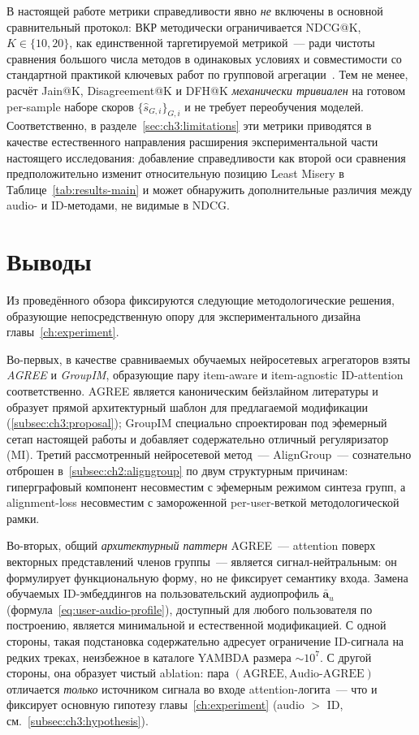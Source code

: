 В настоящей работе метрики справедливости явно \emph{не} включены в основной сравнительный протокол: ВКР методически ограничивается NDCG@K, $K \in \{10, 20\}$, как единственной таргетируемой метрикой~--- ради чистоты сравнения большого числа методов в одинаковых условиях и совместимости со стандартной практикой ключевых работ по групповой агрегации~\cite{cao2018agree, sankar2020groupim, xu2024aligngroup}. Тем не менее, расчёт Jain@K, Disagreement@K и DFH@K \emph{механически тривиален} на готовом per-sample наборе скоров $\{\hat{s}_{G, i}\}_{G, i}$ и не требует переобучения моделей. Соответственно, в разделе~\ref{sec:ch3:limitations} эти метрики приводятся в качестве естественного направления расширения экспериментальной части настоящего исследования: добавление справедливости как второй оси сравнения предположительно изменит относительную позицию Least Misery в Таблице~\ref{tab:results-main} и может обнаружить дополнительные различия между audio- и ID-методами, не видимые в NDCG.

\section{Выводы}
\label{sec:ch2:conclusion}

Из проведённого обзора фиксируются следующие методологические решения, образующие непосредственную опору для экспериментального дизайна главы~\ref{ch:experiment}.

Во-первых, в качестве сравниваемых обучаемых нейросетевых агрегаторов взяты \emph{AGREE} и \emph{GroupIM}, образующие пару item-aware и item-agnostic ID-attention соответственно. AGREE является каноническим бейзлайном литературы и образует прямой архитектурный шаблон для предлагаемой модификации (\ref{subsec:ch3:proposal}); GroupIM специально спроектирован под эфемерный сетап настоящей работы и добавляет содержательно отличный регуляризатор (MI). Третий рассмотренный нейросетевой метод~--- AlignGroup~--- сознательно отброшен в~\ref{subsec:ch2:aligngroup} по двум структурным причинам: гиперграфовый компонент несовместим с эфемерным режимом синтеза групп, а alignment-loss несовместим с замороженной per-user-веткой методологической рамки.

Во-вторых, общий \emph{архитектурный паттерн} AGREE~--- attention поверх векторных представлений членов группы~--- является сигнал-нейтральным: он формулирует функциональную форму, но не фиксирует семантику входа. Замена обучаемых ID-эмбеддингов на пользовательский аудиопрофиль $\bar{\mathbf{a}}_u$ (формула~\eqref{eq:user-audio-profile}), доступный для любого пользователя по построению, является минимальной и естественной модификацией. С одной стороны, такая подстановка содержательно адресует ограничение ID-сигнала на редких треках, неизбежное в каталоге YAMBDA размера $\sim\!10^7$. С другой стороны, она образует чистый ablation: пара $(\text{AGREE}, \text{Audio-AGREE})$ отличается \emph{только} источником сигнала во входе attention-логита~--- что и фиксирует основную гипотезу главы~\ref{ch:experiment} (audio $>$ ID, см.~\ref{subsec:ch3:hypothesis}).

